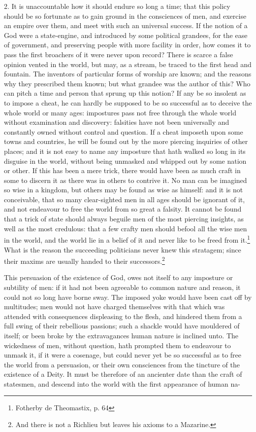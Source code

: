 \documentclass[a5paper]{book}
\begin{document}
2. It is unaccountable how it should endure so long a time; that
this policy should be so fortunate as to gain ground in the 
consciences of men, and exercise an empire over them, and meet with
such an universal success. If the notion of a God were a 
state-engine, and introduced by some political grandees, for the ease of
government, and preserving people with more facility in order, how
comes it to pass the first broachers of it were never upon record?
There is scarce a false opinion vented in the world, but may, as a
stream, be traced to the first head and fountain. The inventors of
particular forms of worship are known; and the reasons why they
prescribed them known; but what grandee was the author of this?
Who can pitch a time and person that sprung up this notion? If
any be so insolent as to impose a cheat, he can hardly be supposed
to be so successful as to deceive the whole world or many ages:
impostures pass not free through the whole world without 
examination and discovery: falsities have not been universally and constantly
owned without control and question. If a cheat imposeth upon some
towns and countries, he will be found out by the more piercing 
inquiries of other places; and it is not easy to name any imposture
that hath walked so long in its disguise in the world, without being
unmasked and whipped out by some nation or other. If this has
been a mere trick, there would have been as much craft in some to
discern it as there was in others to contrive it. No man can be
imagined so wise in a kingdom, but others may be found as wise as
himself: and it is not conceivable, that so many clear-sighted men
in all ages should be ignorant of it, and not endeavour to free the
world from so great a falsity. It cannot be found that a trick of
state should always beguile men of the most piercing insights, as
well as the most credulous: that a few crafty men should befool all
the wise men in the world, and the world lie in a belief of it and
never like to be freed from it.\footnote{Fotherby de Theomastix, p. 64}
What is the reason the succeeding politicians never knew this stratagem; 
since their maxims are usually handed to their successors.\footnote{And there is not a Richlieu but leaves his axioms to a Mazarine.}

This persuasion of the existence of God, owes not itself to any 
imposture or subtility of men: if it had not been agreeable to common
nature and reason, it could not so long have borne sway. The 
imposed yoke would have been cast off by multitudes; men would not
have charged themselves with that which was attended with 
consequences displeasing to the flesh, and hindered them from a full swing
of their rebellious passions; such a shackle would have mouldered
of itself; or been broke by the extravagances human nature is inclined
unto. The wickedness of men, without question, hath prompted
them to endeavour to unmask it, if it were a cosenage, but could
never yet be so successful as to free the world from a persuasion, or
their own consciences from the tincture of the existence of a Deity.
It must be therefore of an ancienter date than the craft of statesmen,
and descend into the world with the first appearance of human na-
\end{document}
